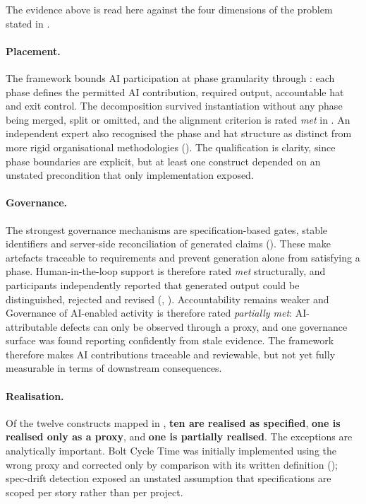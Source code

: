 The evidence above is read here against the four dimensions of the problem stated in .

\paragraph{Placement.}
The framework bounds AI participation at phase granularity through : each phase defines the permitted AI contribution, required output, accountable hat and exit control. The decomposition survived instantiation without any phase being merged, split or omitted, and the alignment criterion is rated \emph{met} in . An independent expert also recognised the phase and hat structure as distinct from more rigid organisational methodologies (). The qualification is clarity, since phase boundaries are explicit, but at least one construct depended on an unstated precondition that only implementation exposed.

\paragraph{Governance.}
The strongest governance mechanisms are specification-based gates, stable identifiers and server-side reconciliation of generated claims (). These make artefacts traceable to requirements and prevent generation alone from satisfying a phase. Human-in-the-loop support is therefore rated \emph{met} structurally, and participants independently reported that generated output could be distinguished, rejected and revised (, ). Accountability remains weaker and Governance of AI-enabled activity is therefore rated \emph{partially met}: AI-attributable defects can only be observed through a proxy, and one governance surface was found reporting confidently from stale evidence. The framework therefore makes AI contributions traceable and reviewable, but not yet fully measurable in terms of downstream consequences.

\paragraph{Realisation.}
Of the twelve constructs mapped in , \textbf{ten are realised as specified}, \textbf{one is realised only as a proxy}, and \textbf{one is partially realised}. The exceptions are analytically important. Bolt Cycle Time was initially implemented using the wrong proxy and corrected only by comparison with its written definition (); spec-drift detection exposed an unstated assumption that specifications are scoped per story rather than per project.

